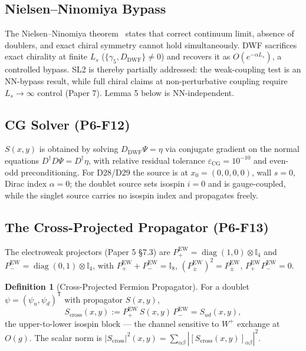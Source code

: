 \documentclass[11pt,a4paper]{article}
\theoremstyle{plain}
\theoremstyle{definition}
\newtheorem{definition}{Definition}
\theoremstyle{remark}
\newcommand{\Scross}{S_{\mathrm{cross}}}
\newcommand{\Pew}{P^{\mathrm{EW}}}
\newcommand{\Id}{\mathbb{I}}
\newcommand{\gfive}{\gamma_{5}}
\begin{document}
\subsection{Nielsen--Ninomiya Bypass}
\label{ssec:NN}

The Nielsen--Ninomiya theorem~\cite{NN1} states that correct continuum
limit, absence of doublers, and exact chiral symmetry cannot hold
simultaneously. DWF sacrifices exact chirality at finite $L_s$
($\{\gfive,D_{\mathrm{DWF}}\}\ne0$) and recovers it as
$O(e^{-\alpha L_s})$, a controlled bypass. SL2 is thereby partially
addressed: the weak-coupling test is an NN-bypass result, while full
chiral claims at non-perturbative coupling require $L_s\to\infty$ control
(Paper 7). Lemma 5 below is NN-independent.

\subsection{CG Solver (P6-F12)}
\label{ssec:cg}

$S(x,y)$ is obtained by solving $D_{\mathrm{DWF}}\Psi=\eta$ via conjugate
gradient on the normal equations $D^\dagger D\Psi=D^\dagger\eta$, with
relative residual tolerance $\varepsilon_{\mathrm{CG}}=10^{-10}$ and
even-odd preconditioning. For D28/D29 the source is at
$x_0=(0,0,0,0)$, wall $s=0$, Dirac index $\alpha=0$; the doublet source
sets isospin $i=0$ and is gauge-coupled, while the singlet source carries
no isospin index and propagates freely.

\subsection{The Cross-Projected Propagator (P6-F13)}
\label{ssec:scross}

The electroweak projectors (Paper 5 \S7.3) are
$\Pew_{+}=\operatorname{diag}(1,0)\otimes\Id_4$ and
$\Pew_{-}=\operatorname{diag}(0,1)\otimes\Id_4$, with
$\Pew_{+}+\Pew_{-}=\Id_8$, $(\Pew_{\pm})^2=\Pew_{\pm}$,
$\Pew_{+}\Pew_{-}=0$.

\begin{definition}[Cross-Projected Fermion Propagator]
For a doublet $\psi=(\psi_u,\psi_d)^{\mathsf T}$ with propagator $S(x,y)$,
\begin{equation}
  \Scross(x,y):=\Pew_{+}\,S(x,y)\,\Pew_{-}=S_{ud}(x,y),
  \label{eq:scrossdef}
\end{equation}
the upper-to-lower isospin block --- the channel sensitive to $W^{+}$
exchange at $O(g)$. The scalar norm is
$|\Scross|^2(x,y)=\sum_{\alpha\beta}|[\Scross(x,y)]_{\alpha\beta}|^2$.
\end{definition}
\end{document}
